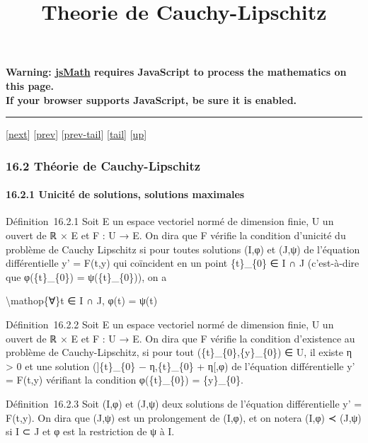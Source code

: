 \documentclass[]{article}
\title{Theorie de Cauchy-Lipschitz}
\author{}
\date{}
\begin{document}
\maketitle

\textbf{Warning: \href{http://www.math.union.edu/locate/jsMath}{jsMath}
requires JavaScript to process the mathematics on this page.\\ If your
browser supports JavaScript, be sure it is enabled.}

\begin{center}\rule{3in}{0.4pt}\end{center}

{[}\href{coursse88.html}{next}{]} {[}\href{coursse86.html}{prev}{]}
{[}\href{coursse86.html\#tailcoursse86.html}{prev-tail}{]}
{[}\hyperref[tailcoursse87.html]{tail}{]}
{[}\href{coursch17.html\#coursse87.html}{up}{]}

\subsubsection{16.2 Théorie de Cauchy-Lipschitz}

\paragraph{16.2.1 Unicité de solutions, solutions maximales}

Définition~16.2.1 Soit E un espace vectoriel normé de dimension finie, U
un ouvert de ℝ × E et F : U → E. On dira que F vérifie la condition
d'unicité du problème de Cauchy Lipschitz si pour toutes solutions (I,φ)
et (J,ψ) de l'équation différentielle y' = F(t,y) qui coïncident en un
point \{t\}\_\{0\} ∈ I ∩ J (c'est-à-dire que φ(\{t\}\_\{0\}) =
ψ(\{t\}\_\{0\})), on a

\textbackslash{}mathop\{∀\}t ∈ I ∩ J, φ(t) = ψ(t)

Définition~16.2.2 Soit E un espace vectoriel normé de dimension finie, U
un ouvert de ℝ × E et F : U → E. On dira que F vérifie la condition
d'existence au problème de Cauchy-Lipschitz, si pour tout
(\{t\}\_\{0\},\{y\}\_\{0\}) ∈ U, il existe η \textgreater{} 0 et une
solution ({]}\{t\}\_\{0\} − η,\{t\}\_\{0\} + η{[},φ) de l'équation
différentielle y' = F(t,y) vérifiant la condition φ(\{t\}\_\{0\}) =
\{y\}\_\{0\}.

Définition~16.2.3 Soit (I,φ) et (J,ψ) deux solutions de l'équation
différentielle y' = F(t,y). On dira que (J,ψ) est un prolongement de
(I,φ), et on notera (I,φ) ≺ (J,ψ) si I ⊂ J et φ est la restriction de ψ
à I.
\end{document}
